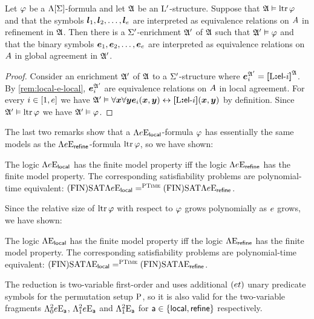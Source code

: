 \begin{remark}
Let $\varphi$ be a $\Lambda[\mathrm{\Sigma}]$-formula and let $\mathfrak{A}$ be an ${\mathrm{L}'}$-structure.
Suppose that $\mathfrak{A} \vDash \operatorname{ltr}\varphi$ and that the symbols
$\bm{l}_{1}, \bm{l}_{2}, \dots, \bm{l}_{e}$ are interpreted as equivalence relations on
$A$ in refinement in $\mathfrak{A}$.
Then there is a $\mathrm{\Sigma'}$-enrichment $\mathfrak{A'}$ of $\mathfrak{A}$ such that
$\mathfrak{A'} \vDash \varphi$ and that the binary symbols
$\bm{e}_{1}, \bm{e}_{2}, \dots, \bm{e}_{e}$
are interpreted as equivalence relations on $A$ in global agreement in
$\mathfrak{A'}$.
\end{remark}
\begin{proof}
Consider an enrichment $\mathfrak{A'}$ of $\mathfrak{A}$ to a $\mathrm{\Sigma'}$-structure where
$\bm{e}_{i}^{\mathfrak{A'}} = {\bm{[}\mathrm{L}\mathord{\bm{:}}\mathsf{el}{\hbox{-}}i\bm{]}}^{\mathfrak{A}}$.
By \cref{rem:local-e-local}, $\bm{e}_{i}^{\mathfrak{A'}}$ are equivalence
relations on $A$ in local agreement. 
For every $i \in [1,e]$ we have
$\mathfrak{A'} \vDash \forall\bm{x} \forall\bm{y} \bm{e}_{i}(\bm{x},\bm{y}) \leftrightarrow {\bm{[}\mathrm{L}\mathord{\bm{:}}\mathsf{el}{\hbox{-}}i\bm{]}}(\bm{x},\bm{y})$
by definition.
Since $\mathfrak{A'} \vDash \operatorname{ltr}\varphi$ we have $\mathfrak{A'} \vDash \varphi$.
\end{proof}

The last two remarks show that a $\Lambda{e}\mathrm{E}_{\mathsf{local}}$-formula $\varphi$
has essentially the same models as the $\Lambda{e}\mathrm{E}_{\mathsf{refine}}$-formula
$\operatorname{ltr}\varphi$, so we have shown:
\begin{proposition}\label{prop:local-to-refine-n}
The logic $\Lambda{e}\mathrm{E}_{\mathsf{local}}$ has the finite model property iff
the logic $\Lambda{e}\mathrm{E}_{\mathsf{refine}}$ has the finite model property.
The corresponding satisfiability problems are polynomial-time equivalent:
$\mathrm{(FIN)SAT}\Lambda{e}\mathrm{E}_{\mathsf{local}} =^{\text{\normalfont{\scshape PTime}}} \mathrm{(FIN)SAT}\Lambda{e}\mathrm{E}_{\mathsf{refine}}$.
\end{proposition}

Since the relative size of $\operatorname{ltr}\varphi$ with respect to $\varphi$ grows
polynomially as $e$ grows, we have shown:
\begin{proposition}\label{prop:local-to-refine}
The logic $\Lambda{{}}\mathrm{E}_{\mathsf{local}}$ has the finite model property iff
the logic $\Lambda{{}}\mathrm{E}_{\mathsf{refine}}$ has the finite model property.
The corresponding satisfiability problems are polynomial-time equivalent:
$\mathrm{(FIN)SAT}\Lambda{{}}\mathrm{E}_{\mathsf{local}} =^{\text{\normalfont{\scshape PTime}}} \mathrm{(FIN)SAT}\Lambda{{}}\mathrm{E}_{\mathsf{refine}}$.
\end{proposition}

The reduction is two-variable first-order and uses additional $(et)$
unary predicate symbols for the permutation setup $\mathrm{P}$, so it is also valid
for the two-variable fragments $\Lambda^{2}_{0}{e}\mathrm{E}_{\mathsf{a}}$, $\Lambda^{2}_{1}{e}\mathrm{E}_{\mathsf{a}}$
and $\Lambda^{2}_{1}{{}}\mathrm{E}_{\mathsf{a}}$ for $\mathsf{a} \in \left\{\mathsf{local}, \mathsf{refine}\right\}$
respectively.